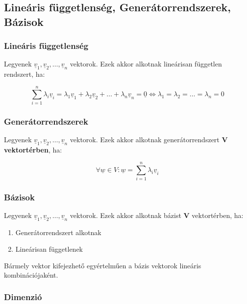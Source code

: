 \documentclass{article}
\begin{document}
\subsection{Lineáris függetlenség, Generátorrendszerek, Bázisok}

\subsubsection{Lineáris függetlenség}
Legyenek $\underline{v}_1, \underline{v}_2, \ldots, \underline{v}_n$ vektorok. Ezek akkor alkotnak lineárisan független rendszert, ha:

\begin{equation*}
    \sum_{i = 1}^{n}\lambda_i\underline{v}_i = \lambda_1\underline{v}_1 + \lambda_2\underline{v}_2 + \ldots + \lambda_n\underline{v}_n = \underline{0} \Leftrightarrow  \lambda_1 = \lambda_2 = \ldots = \lambda_n = 0
\end{equation*}

\subsubsection{Generátorrendszerek}

Legyenek $\underline{v}_1, \underline{v}_2, \ldots, \underline{v}_n$ vektorok. Ezek akkor alkotnak generátorrendszert \textbf{V vektortérben}, ha:

\begin{equation*}
    \forall \underline{w} \in V: \underline{w} = \sum_{i = 1}^{n}\lambda_i\underline{v}_i
\end{equation*}

\subsubsection{Bázisok}

Legyenek $\underline{v}_1, \underline{v}_2, \ldots, \underline{v}_n$ vektorok. Ezek akkor alkotnak bázist $\mathbf{V}$ vektortérben, ha:

\begin{enumerate}
    \item Generátorrendszert alkotnak
    \item Lineárisan függetlenek   
\end{enumerate}

Bármely vektor kifejezhető egyértelműen a bázis vek\-tor\-ok li\-ne\-ár\-is kom\-bi\-ná\-ci\-ójaként.

\subsubsection{Dimenzió}
\end{document}
